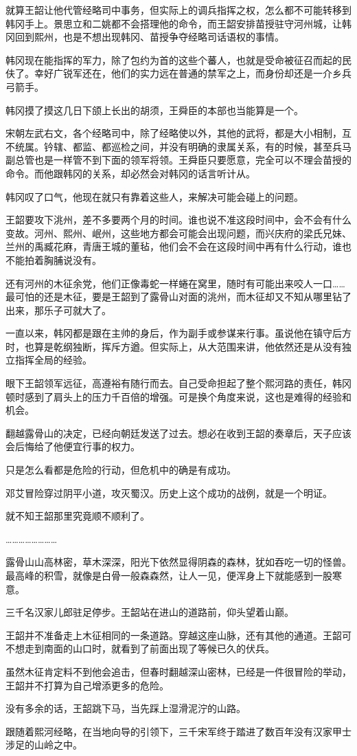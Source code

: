 就算王韶让他代管经略司中事务，但实际上的调兵指挥之权，怎么都不可能转移到韩冈手上。景思立和二姚都不会搭理他的命令，而王韶安排苗授驻守河州城，让韩冈回到熙州，也是不想出现韩冈、苗授争夺经略司话语权的事情。

韩冈现在能指挥的军力，除了包约为首的这些个蕃人，也就是受命被征召而起的民伕了。幸好广锐军还在，他们的实力远在普通的禁军之上，而身份却还是一介乡兵弓箭手。

韩冈摸了摸这几日下颌上长出的胡须，王舜臣的本部也当能算是一个。

宋朝左武右文，各个经略司中，除了经略使以外，其他的武将，都是大小相制，互不统属。钤辖、都监、都巡检之间，并没有明确的隶属关系，有的时候，甚至兵马副总管也是一样管不到下面的领军将领。王舜臣只要愿意，完全可以不理会苗授的命令。而他跟韩冈的关系，却必然会对韩冈的话言听计从。

韩冈叹了口气，他现在就只有靠着这些人，来解决可能会碰上的问题。

王韶要攻下洮州，差不多要两个月的时间。谁也说不准这段时间中，会不会有什么变故。河州、熙州、岷州，这些地方都会可能会出现问题，而兴庆府的梁氏兄妹、兰州的禹臧花麻，青唐王城的董毡，他们会不会在这段时间中再有什么行动，谁也不能拍着胸脯说没有。

还有河州的木征余党，他们正像毒蛇一样蜷在窝里，随时有可能出来咬人一口……最可怕的还是木征，要是王韶到了露骨山对面的洮州，而木征却又不知从哪里钻了出来，那乐子可就大了。

一直以来，韩冈都是跟在主帅的身后，作为副手或参谋来行事。虽说他在镇守后方时，也算是乾纲独断，挥斥方遒。但实际上，从大范围来讲，他依然还是从没有独立指挥全局的经验。

眼下王韶领军远征，高遵裕有随行而去。自己受命担起了整个熙河路的责任，韩冈顿时感到了肩头上的压力千百倍的增强。可是换个角度来说，这也是难得的经验和机会。

翻越露骨山的决定，已经向朝廷发送了过去。想必在收到王韶的奏章后，天子应该会后悔给了他便宜行事的权力。

只是怎么看都是危险的行动，但危机中的确是有成功。

邓艾冒险穿过阴平小道，攻灭蜀汉。历史上这个成功的战例，就是一个明证。

就不知王韶那里究竟顺不顺利了。

……………………

露骨山山高林密，草木深深，阳光下依然显得阴森的森林，犹如吞吃一切的怪兽。最高峰的积雪，就像是白骨一般森森然，让人一见，便浑身上下就能感到一股寒意。

三千名汉家儿郎驻足停步。王韶站在进山的道路前，仰头望着山巅。

王韶并不准备走上木征相同的一条道路。穿越这座山脉，还有其他的通道。王韶可不想走到南面的山口时，就看到了前面出现了等候已久的伏兵。

虽然木征肯定料不到他会追击，但春时翻越深山密林，已经是一件很冒险的举动，王韶并不打算为自己增添更多的危险。

没有多余的话，王韶跳下马，当先踩上湿滑泥泞的山路。

跟随着熙河经略，在当地向导的引领下，三千宋军终于踏进了数百年没有汉家甲士涉足的山岭之中。

